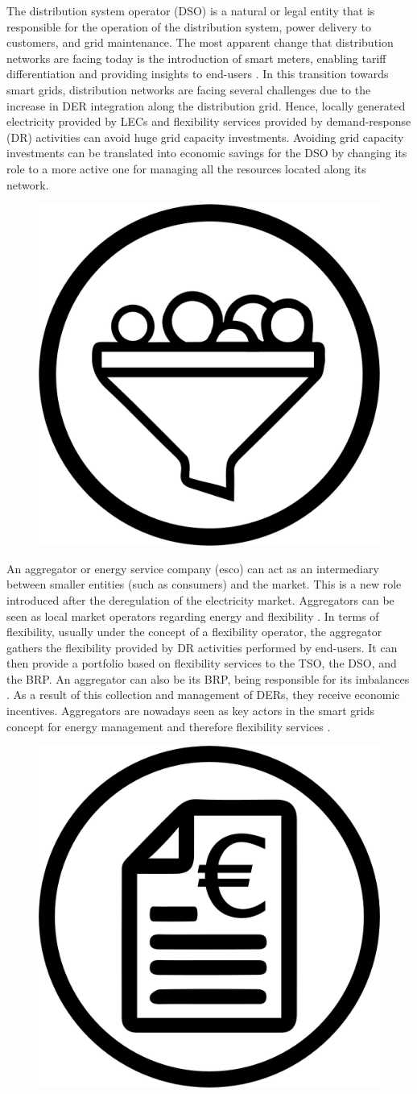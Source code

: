 The distribution system operator (DSO) is a natural or legal entity that is responsible for the operation of the distribution system, power delivery to customers, and grid maintenance. The most apparent change that distribution networks are facing today is the introduction of smart meters, enabling tariff differentiation and providing insights to end-users \cite{USEFFoundation2015a}.
In this transition towards smart grids, distribution networks are facing several challenges due to the increase in DER integration along the distribution grid. Hence, locally generated electricity provided by LECs and flexibility services provided by demand-response (DR) activities can avoid huge grid capacity investments. Avoiding grid capacity investments can be translated into economic savings for the DSO by changing its role to a more active one for managing all the resources located along its network.\\

\begin{figure}
	\centering
	\includegraphics[width=0.1\columnwidth ]{ChapterIntro/Figures/Aggregator.jpg}
	\label{Aggregator}  
\end{figure}

An aggregator or energy service company (esco) can act as an intermediary between smaller entities (such as consumers) and the market. This is a new role introduced after the deregulation of the electricity market. Aggregators can be seen as local market operators regarding energy and flexibility \cite{Olivella2018}. In terms of flexibility, usually under the concept of a flexibility operator, the aggregator gathers the flexibility provided by DR activities performed by end-users. It can then provide a portfolio based on flexibility services to the TSO, the DSO, and the BRP. An aggregator can also be its BRP, being responsible for its imbalances \cite{VILLAR2018Flexibility}. As a result of this collection and management of DERs, they receive economic incentives. Aggregators are nowadays seen as key actors in the smart grids concept for energy management and therefore flexibility services \cite{Carreiro2017}.\\

\begin{figure}
	\centering
	\includegraphics[width=0.1\columnwidth ]{ChapterIntro/Figures/bill.jpg}
	\label{retailer}  
\end{figure}


